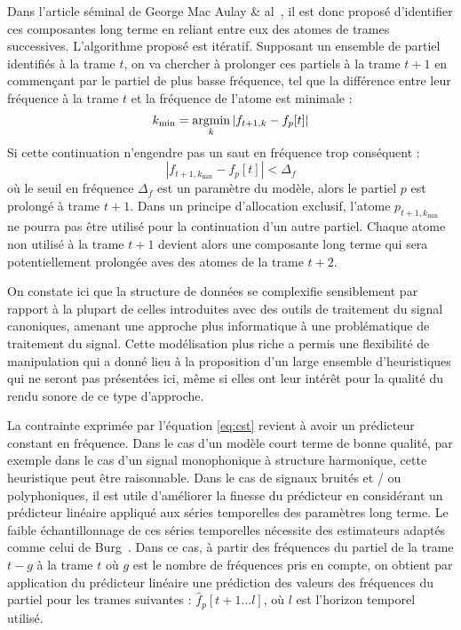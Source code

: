 Dans l'article séminal de George Mac Aulay \& al~\cite{mcaulay}, il est donc proposé \og d'identifier \fg ces composantes long terme en reliant entre eux des atomes de trames successives. L'algorithme proposé est itératif. Supposant un ensemble de partiel identifiés à la trame $t$, on va chercher à prolonger ces partiels à la trame $t+1$ en commençant par le partiel de plus basse fréquence, tel que la différence entre leur fréquence à la trame $t$ et la fréquence de l'atome est minimale :
\begin{equation}
k_{\mathrm{min}} = \operatorname*{argmin}_{k}\left|f_{t+1, k}-f_{p}[t]\right|
\label{eq:mac}
\end{equation}
Si cette continuation n'engendre pas un saut en fréquence trop conséquent :
\begin{equation}
\left|f_{t+1, k_{\mathrm{min}}}-f_{p}[t]\right|<\Delta_{f}
\label{eq:macseuil}
\end{equation}
où le seuil en fréquence $\Delta_{f}$ est un paramètre du modèle, alors le partiel $p$ est prolongé à trame $t+1$. Dans un principe d'allocation exclusif, l'atome $p_{t+1, k_{\mathrm{min}}}$ ne pourra pas être utilisé pour la continuation d'un autre partiel. Chaque atome non utilisé à la trame $t+1$ devient alors une composante long terme qui sera potentiellement prolongée aves des atomes de la trame $t+2$.

On constate ici que la structure de données se complexifie sensiblement par rapport à la plupart de celles introduites avec des outils de traitement du signal canoniques, amenant une approche plus \og informatique \fg à une problématique de traitement du signal. Cette modélisation plus \og riche \fg a permis une flexibilité de manipulation qui a donné lieu à la proposition d'un large ensemble d'heuristiques qui ne seront pas présentées ici, même si elles ont leur intérêt pour la qualité du rendu sonore de ce type d'approche.

La contrainte exprimée par l'équation \ref{eq:cst} revient à avoir un prédicteur constant en fréquence. Dans le cas d'un modèle court terme de bonne qualité, par exemple dans le cas d'un signal monophonique à structure harmonique, cette heuristique peut être raisonnable. Dans le cas de signaux bruités et / ou polyphoniques, il est utile d'améliorer la finesse du prédicteur en considérant un prédicteur linéaire appliqué aux séries temporelles des paramètres long terme. Le faible échantillonnage de ces séries temporelles nécessite des estimateurs adaptés comme celui de Burg~\cite{burg1968new}. Dans ce cas, à partir des fréquences du partiel de la trame $t-g$ à la trame $t$ où $g$ est le nombre de fréquences pris en compte, on obtient par application du prédicteur linéaire une prédiction des valeurs des fréquences du partiel pour les trames suivantes : $\hat{f}_{p}[t+1...l]$, où $l$ est l'horizon temporel utilisé.



